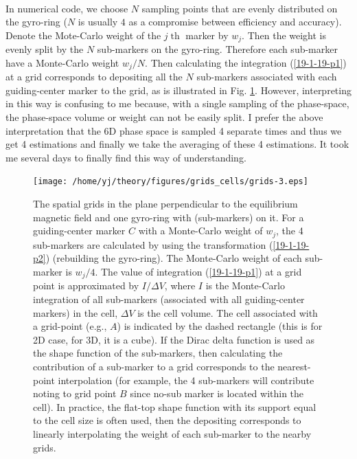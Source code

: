 \documentclass{llncs}
\newcommand{\tmcolor}[2]{{\color{#1}{#2}}}
\newcommand{\tmop}[1]{\ensuremath{\operatorname{#1}}}
\begin{document}
\

In numerical code, we choose $N$ sampling points that are evenly distributed
on the gyro-ring ($N$ is usually $4$ as a compromise between efficiency and
accuracy). Denote the Mote-Carlo weight of the $j \tmop{th}$ marker by $w_j$.
Then the weight is evenly split by the $N$ sub-markers on the gyro-ring.
Therefore each sub-marker have a Monte-Carlo weight $w_j / N$. Then
calculating the integration (\ref{19-1-19-p1}) at a grid corresponds to
depositing all the $N$ sub-markers associated with each guiding-center marker
to the grid, as is illustrated in Fig. \ref{19-1-19-p4}. However, interpreting
in this way is confusing to me because, with a single sampling of the
phase-space, the phase-space volume or weight can not be easily split. I
prefer the above interpretation that the 6D phase space is sampled 4 separate
times and thus we get 4 estimations and finally we take the averaging of these
4 estimations. It took me several days to finally find this way of
understanding.

\begin{figure}[h]
  \texttt{[image: /home/yj/theory/figures/grids\_cells/grids-3.eps]}
  \caption{\label{19-1-19-p4}The spatial grids in the plane perpendicular to
  the equilibrium magnetic field and one gyro-ring with \tmcolor{blue}{4
  sampling points} (sub-markers) on it. For a guiding-center marker $C$ with a
  Monte-Carlo weight of $w_j$, the 4 sub-markers are calculated by using the
  transformation (\ref{19-1-19-p2}) (rebuilding the gyro-ring). The
  Monte-Carlo weight of each sub-marker is $w_j / 4$. The value of integration
  (\ref{19-1-19-p1}) at a grid point is approximated by $I / \Delta V$, where
  $I$ is the Monte-Carlo integration of all sub-markers (associated with all
  guiding-center markers) in the cell, $\Delta V$ is the cell volume. The cell
  associated with a grid-point (e.g., $A$) is indicated by the dashed
  rectangle (this is for 2D case, for 3D, it is a cube). If the Dirac delta
  function is used as the shape function of the sub-markers, then calculating
  the contribution of a sub-marker to a grid corresponds to the nearest-point
  interpolation (for example, the 4 sub-markers will contribute noting to grid
  point $B$ since no-sub marker is located within the cell). In practice, the
  flat-top shape function with its support equal to the cell size is often
  used, then the depositing corresponds to linearly interpolating the weight
  of each sub-marker to the nearby grids.}
\end{figure}
\end{document}
